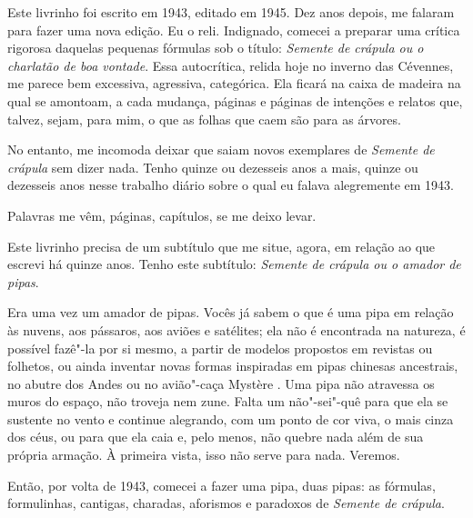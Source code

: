 \pagebreak
\thispagestyle{empty}
\movetooddpage
\thispagestyle{empty}
\begin{vplace}[0.25]


{\large{}}
\end{vplace}

\pagebreak
\thispagestyle{empty}

\movetooddpage

Este livrinho foi escrito em 1943, editado em 1945. Dez anos depois, me
falaram para fazer uma nova edição. Eu o reli. Indignado, comecei a
preparar uma crítica rigorosa daquelas pequenas fórmulas sob o título:
\emph{Semente de crápula ou o charlatão de boa vontade}. Essa
autocrítica, relida hoje no inverno das Cévennes, me parece bem
excessiva, agressiva, categórica. Ela ficará na caixa de madeira na
qual se amontoam, a cada mudança, páginas e páginas de intenções e
relatos que, talvez, sejam, para mim, o que as folhas que caem são para as
árvores.

No entanto, me incomoda deixar que saiam novos exemplares de
\emph{Semente de crápula} sem dizer nada. Tenho quinze ou dezesseis anos
a mais, quinze ou dezesseis anos nesse trabalho diário sobre o qual eu falava
alegremente em 1943.

Palavras me vêm, páginas, capítulos, se me deixo levar.

Este livrinho precisa de um subtítulo que me situe, agora, em relação ao
que escrevi há quinze anos. Tenho este subtítulo: \emph{Semente de
crápula ou o amador de pipas}.

Era uma vez um amador de pipas. Vocês já sabem o que é uma pipa em
relação às nuvens, aos pássaros, aos aviões e satélites; ela não é
encontrada na natureza, é possível fazê"-la por si mesmo, a partir de
modelos propostos em revistas ou folhetos, ou ainda inventar novas
formas inspiradas em pipas chinesas ancestrais, no abutre dos Andes ou
no avião"-caça Mystère . Uma pipa não atravessa os muros do espaço, não
troveja nem zune. Falta um não"-sei"-quê para que ela se sustente no vento
e continue alegrando, com um ponto de cor viva, o mais cinza dos céus,
ou para que ela caia e, pelo menos, não quebre nada além de sua própria
armação. À primeira vista, isso não serve para nada. Veremos.

Então, por volta de 1943, comecei a fazer uma pipa, duas pipas: as
fórmulas, formulinhas, cantigas, charadas, aforismos e paradoxos de
\emph{Semente de crápula}.

